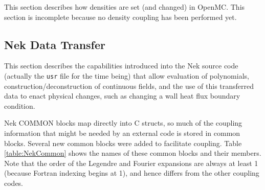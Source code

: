 \documentclass[10pt]{article}
\newcounter{subsubsubsection}[subsubsection]
\numberwithin{equation}{section} %
\begin{document}

This section describes how densities are set (and changed) in OpenMC. This section is incomplete because no density coupling has been performed yet.

\subsection{Nek Data Transfer}
\label{sec:NekTransfer}
This section describes the capabilities introduced into the Nek source code (actually the {\tt usr} file for the time being) that allow evaluation of polynomials, construction/deconstruction of continuous fields, and the use of this transferred data to enact physical changes, such as changing a wall heat flux boundary condition.

Nek COMMON blocks map directly into C structs, so much of the coupling information that might be needed by an external code is stored in common blocks. Several new common blocks were added to facilitate coupling. Table \ref{table:NekCommon} shows the names of these common blocks and their members. Note that the order of the Legendre and Fourier expansions are always at least 1 (because Fortran indexing begins at 1), and hence differs from the other coupling codes.
\end{document}
